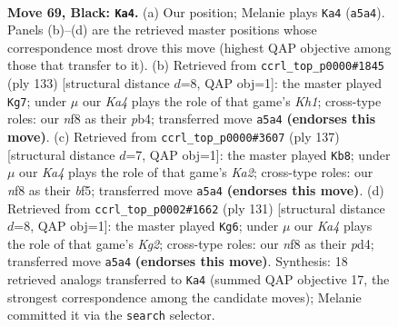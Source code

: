 \documentclass[11pt]{article}
\begin{document}
\clearpage

\begin{figure}[p]\centering
\begin{subfigure}{0.46\textwidth}\centering
\resizebox{\linewidth}{!}{%
\newchessgame
\chessboard[
  setfen={5N1K/1Q6/8/k7/6q1/8/8/8 b - - 8 69},
  showmover=false,
  pgfstyle=straightmove, color=movearrow, markmove={a5-a4}
]}
\caption{}
\end{subfigure}\hfill
\begin{subfigure}{0.46\textwidth}\centering
\resizebox{\linewidth}{!}{%
\newchessgame
\chessboard[
  setfen={2Q4k/8/8/7p/1P6/4q3/7K/8 b - - 3 67},
  showmover=false,
  pgfstyle=straightmove, color=movearrow, markmove={h8-g7}
]}
\caption{}
\end{subfigure}
\\[4pt]
\begin{subfigure}{0.46\textwidth}\centering
\resizebox{\linewidth}{!}{%
\newchessgame
\chessboard[
  setfen={3q4/k4K2/8/5B2/Q7/8/8/8 b - - 8 69},
  showmover=false,
  pgfstyle=straightmove, color=movearrow, markmove={a7-b8}
]}
\caption{}
\end{subfigure}\hfill
\begin{subfigure}{0.46\textwidth}\centering
\resizebox{\linewidth}{!}{%
\newchessgame
\chessboard[
  setfen={8/4Q1k1/8/8/2pP4/8/5K2/7q b - - 8 66},
  showmover=false,
  pgfstyle=straightmove, color=movearrow, markmove={g7-g6}
]}
\caption{}
\end{subfigure}
\caption{\textbf{Move 69, Black: \texttt{Ka4}.} (a) Our position; Melanie plays \texttt{Ka4} (\texttt{a5a4}). Panels (b)--(d) are the retrieved master positions whose correspondence most drove this move (highest QAP objective among those that transfer to it). (b) Retrieved from \texttt{ccrl\_top\_p0000\#1845} (ply 133) [structural distance $d$=8, QAP obj=1]: the master played \texttt{Kg7}; under $\mu$ our \emph{Ka4} plays the role of that game's \emph{Kh1}; cross-type roles: our \emph{n}f8 as their \emph{p}b4; transferred move \texttt{a5a4} \textbf{(endorses this move)}. (c) Retrieved from \texttt{ccrl\_top\_p0000\#3607} (ply 137) [structural distance $d$=7, QAP obj=1]: the master played \texttt{Kb8}; under $\mu$ our \emph{Ka4} plays the role of that game's \emph{Ka2}; cross-type roles: our \emph{n}f8 as their \emph{b}f5; transferred move \texttt{a5a4} \textbf{(endorses this move)}. (d) Retrieved from \texttt{ccrl\_top\_p0002\#1662} (ply 131) [structural distance $d$=8, QAP obj=1]: the master played \texttt{Kg6}; under $\mu$ our \emph{Ka4} plays the role of that game's \emph{Kg2}; cross-type roles: our \emph{n}f8 as their \emph{p}d4; transferred move \texttt{a5a4} \textbf{(endorses this move)}. Synthesis: 18 retrieved analogs transferred to \texttt{Ka4} (summed QAP objective 17, the strongest correspondence among the candidate moves); Melanie committed it via the \texttt{search} selector.}
\label{fig:thought-m137}
\end{figure}
\end{document}
